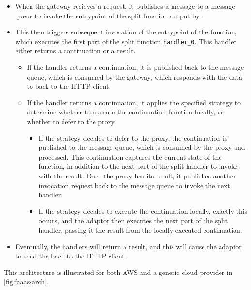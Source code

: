 \begin{itemize}
\item[1] When the gateway recieves a request, it publishes a message to a message queue to invoke the entrypoint of the split function output by \faaasc{}.

\item[2] This then triggers subsequent invocation of the entrypoint of the function, which executes the first part of the split function \verb|handler_0|. This handler either returns a continuation or a result.

\begin{itemize}
\item[a] If the handler returns a continuation, it is published back to the message queue, which is consumed by the gateway, which responds with the data to back to the HTTP client.

\item[b] If the handler returns a continuation, it applies the specified strategy to determine whether to execute the continuation function locally, or whether to defer to the proxy.

\begin{itemize}
\item[i] If the strategy decides to defer to the proxy, the continuation is published to the message queue, which is consumed by the proxy and processed. This continuation captures the current state of the function, in addition to the next part of the split handler to invoke with the result. Once the proxy has its result, it publishes another invocation request back to the message queue to invoke the next handler.

\item[ii] If the strategy decides to execute the continuation locally, exactly this occurs, and the adaptor then executes the next part of the split handler, passing it the result from the locally executed continuation.
\end{itemize}
\end{itemize}

\item[3] Eventually, the handlers will return a result, and this will cause the adaptor to send the back to the HTTP client.
\end{itemize}

This architecture is illustrated for both AWS and a generic cloud provider in \ref{fig:faaas-arch}.

\begin{figure*}
    \centering
    \caption{\faaas{} architecture utilising AWS cloud primitives, for comparison with the cloud agnostic \faaastime{} implementation}
    \label{fig:faaas-arch}
\end{figure*}

